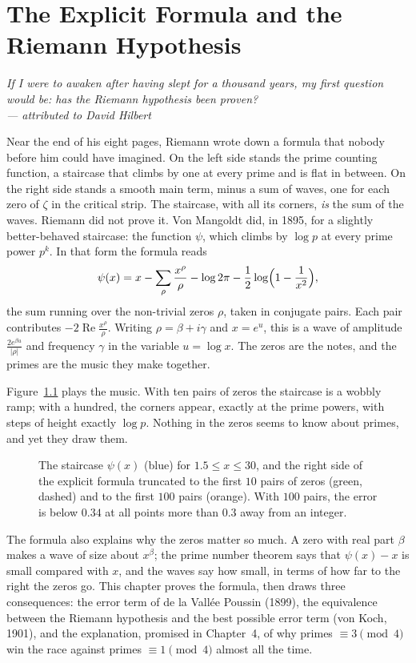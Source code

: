 \chapter{The Explicit Formula and the Riemann Hypothesis}

\begin{center}\itshape
If I were to awaken after having slept for a thousand years, my first question would be: has the Riemann hypothesis been proven?\\
\upshape --- attributed to David Hilbert
\end{center}

Near the end of his eight pages, Riemann wrote down a formula that nobody before him could have imagined. On the left side stands the prime counting
function, a staircase that climbs by one at every prime and is flat in between. On the right side stands a smooth main term, minus a sum of waves, one for each
zero of $\zeta$ in the critical strip. The staircase, with all its corners, \emph{is} the sum of the waves. Riemann did not prove it. Von Mangoldt did, in 1895,
for a slightly better-behaved staircase: the function $\psi$, which climbs by $\log p$ at every prime power $p^k$. In that form the formula reads
\[
\psi(x)=x-\sum_\rho\frac{x^\rho}\rho-\log2\pi-\frac12\log\Bigl(1-\frac1{x^2}\Bigr),
\]
the sum running over the non-trivial zeros $\rho$, taken in conjugate pairs. Each pair contributes $-2\operatorname{Re}\frac{x^\rho}\rho$. Writing $\rho=\beta+i\gamma$ and $x=e^u$, this is a wave of
amplitude $\frac{2e^{\beta u}}{|\rho|}$ and frequency $\gamma$ in the variable $u=\log x$. The zeros are the notes, and the primes are the music they make together.

Figure~\ref{fig:explicit} plays the music. With ten pairs of zeros the staircase is a wobbly ramp; with a hundred, the corners appear, exactly at the prime powers, with
steps of height exactly $\log p$. Nothing in the zeros seems to know about primes, and yet they draw them.

\begin{figure}[ht]
\centering
{}
\caption{The staircase $\psi(x)$ (blue) for $1.5\le x\le30$, and the right side of the explicit formula truncated to the first $10$ pairs of zeros (green, dashed) and to the
first $100$ pairs (orange). With $100$ pairs, the error is below $0.34$ at all points more than $0.3$ away from an integer.}
\label{fig:explicit}
\end{figure}

The formula also explains why the zeros matter so much. A zero with real part $\beta$ makes a wave of size about $x^\beta$; the prime number theorem says that
$\psi(x)-x$ is small compared with $x$, and the waves say how small, in terms of how far to the right the zeros go. This chapter proves the formula, then draws
three consequences: the error term of de la Vallée Poussin (1899), the equivalence between the Riemann hypothesis and the best possible error term (von Koch, 1901),
and the explanation, promised in Chapter~4, of why primes $\equiv3\pmod4$ win the race against primes $\equiv1\pmod4$ almost all the time.

